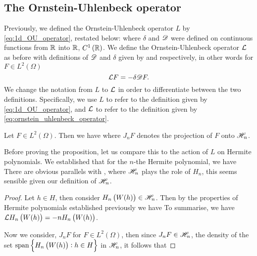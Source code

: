 \documentclass[../main.tex]{subfiles}
\begin{document}
\subsection{The Ornstein-Uhlenbeck operator}
Previously, we defined the Ornstein-Uhlenbeck operator $L$ by \eqref{eq:1d_OU_operator}, restated below:
 where $\delta$ and $\mathscr{D}$ were defined on continuous functions from $\operatorname{\mathbb{R}}$ into $\operatorname{\mathbb{R}}$, $C^1\del{\R}$. We define the Ornstein-Uhlenbeck operator $\mathcal{L}$ as before with definitions of $\mathscr{D}$ and $\delta$ given by  and  respectively, in other words for $F\in L^2(\Omega)$
\begin{equation}
    \label{eq:ornstein_uhlenbeck_operator}
    \mathcal{L} F = -\delta\mathscr{D} F.
\end{equation}
We change the notation from $L$ to $\mathcal{L}$ in order to differentiate between the two definitions. Specifically, we use $L$ to refer to the definition given by \eqref{eq:1d_OU_operator}, and $\mathcal{L}$ to refer to the definition given by \eqref{eq:ornstein_uhlenbeck_operator}.
\begin{proposition}
\label{prop:OU_on_Wiener_chaos}
Let $F\in L^2(\Omega)$. Then we have  where $J_nF$ denotes the projection of $F$ onto $\mathscr{H}_n$.
\end{proposition}
Before proving the proposition, let us compare this to the action of $L$ on Hermite polynomials. We established that for the $n$-the Hermite polynomial, we have  There are obvious parallels with , where $\mathscr{H}_n$ plays the role of $H_n$, this seems sensible given our definition of $\mathscr{H}_n$.
\begin{proof}
Let $h\in H$, then consider $H_n\del{W(h)}\in\Wie_n$. Then by the properties of Hermite polynomials established previously we have  To summarise, we have $\L H_n\del{W(h)} = -nH_n\del{W(h)}$.

Now we consider, $J_nF$ for $F\in L^2(\Omega)$, then since $J_nF\in\mathscr{H}_n$, the density of the set \newline $\span\cbr{H_n\del{W(h)}:h\in H}$ in $\mathscr{H}_n$, it follows that 
\end{proof}
\end{document}
